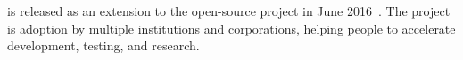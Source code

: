 

\graphenesgx{} is released as an extension to the open-source \graphene{} project in June 2016~\cite{graphene-github}.
The project is adoption by multiple institutions and corporations, helping people to accelerate \sgx{} development, testing, and research.




